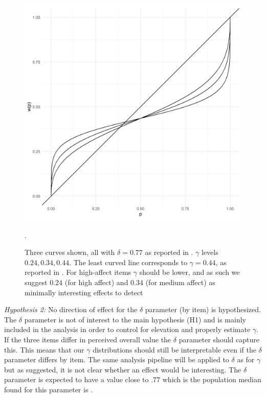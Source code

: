\documentclass[12pt]{article}
\begin{document}
\begin{figure}[h!]
	\includegraphics[width = \linewidth]
	{../Figures/ourHyp.png}
	\caption{Three curves shown, all with $\delta = 0.77$
	as reported in \textcite{gonzalez1999shape}.
	$\gamma$ levels $0.24, 0.34, 0.44$. The
	least curved line corresponds to $\gamma = 0.44$,
	as reported in \textcite{gonzalez1999shape}.
	For high-affect items $\gamma$ should
	be lower, and as such we suggest $0.24$
	(for high affect) and  $0.34$ (for medium
	affect) as minimally interesting effects
to detect}.
\end{figure}

\emph{Hypothesis 2:} No direction of effect
for the $\delta$ parameter (by item) is
hypothesized. The  $\delta$ parameter is
not of interest to the main hypothesis (H1)
and is mainly included in the analysis in
order to control for elevation and properly
estimate  $\gamma$. If the three items differ
in perceived overall value the $\delta$ parameter
should capture this. This means that our $\gamma$
distributions should still be interpretable
even if the $\delta$ parameter differs by
item. The same analysis pipeline will be applied
to $\delta$ as for $\gamma$ but as suggested,
it is not clear whether an effect would
be interesting. The $\delta$ parameter is
expected to have a value close to $.77$
which is the population median found for
this parameter is \textcite{gonzalez1999shape}.
\end{document}
